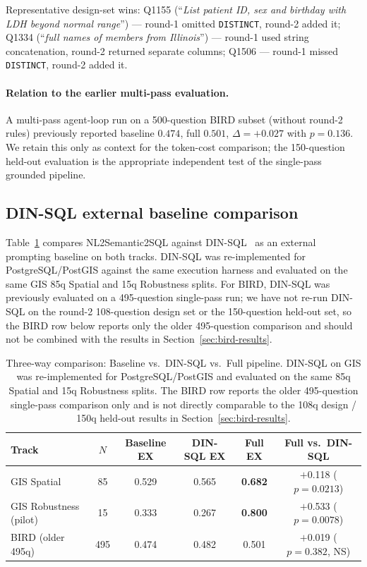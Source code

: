 \documentclass[11pt]{article}
\begin{document}
Representative design-set wins: Q1155 (``\emph{List patient ID, sex and birthday with LDH beyond normal range}'') --- round-1 omitted \texttt{DISTINCT}, round-2 added it; Q1334 (``\emph{full names of members from Illinois}'') --- round-1 used string concatenation, round-2 returned separate columns; Q1506 --- round-1 missed \texttt{DISTINCT}, round-2 added it.

\paragraph{Relation to the earlier multi-pass evaluation.} A multi-pass agent-loop run on a 500-question BIRD subset (without round-2 rules) previously reported baseline $0.474$, full $0.501$, $\Delta=+0.027$ with $p=0.136$. We retain this only as context for the token-cost comparison; the 150-question held-out evaluation is the appropriate independent test of the single-pass grounded pipeline.

\subsection{DIN-SQL external baseline comparison}
\label{sec:dinsql}

Table~\ref{tab:dinsql} compares NL2Semantic2SQL against DIN-SQL~\cite{pourreza2023dinsql} as an external prompting baseline on both tracks. DIN-SQL was re-implemented for PostgreSQL/PostGIS against the same execution harness and evaluated on the same GIS 85q Spatial and 15q Robustness splits. For BIRD, DIN-SQL was previously evaluated on a 495-question single-pass run; we have not re-run DIN-SQL on the round-2 108-question design set or the 150-question held-out set, so the BIRD row below reports only the older 495-question comparison and should not be combined with the results in Section~\ref{sec:bird-results}.

\begin{table}[t]
\centering
\caption{Three-way comparison: Baseline vs.\ DIN-SQL vs.\ Full pipeline. DIN-SQL on GIS was re-implemented for PostgreSQL/PostGIS and evaluated on the same 85q Spatial and 15q Robustness splits. The BIRD row reports the older 495-question single-pass comparison only and is not directly comparable to the 108q design / 150q held-out results in Section~\ref{sec:bird-results}.}
\label{tab:dinsql}
\begin{tabular}{lccccc}
\toprule
Track & $N$ & Baseline EX & DIN-SQL EX & Full EX & Full vs.\ DIN-SQL \\
\midrule
GIS Spatial        & 85  & 0.529 & 0.565 & \textbf{0.682} & $+$0.118 ($p=0.0213$) \\
GIS Robustness (pilot) & 15  & 0.333 & 0.267 & \textbf{0.800} & $+$0.533 ($p=0.0078$) \\
BIRD (older 495q)  & 495 & 0.474 & 0.482 & 0.501 & $+$0.019 ($p=0.382$, NS) \\
\bottomrule
\end{tabular}
\end{table}
\end{document}
